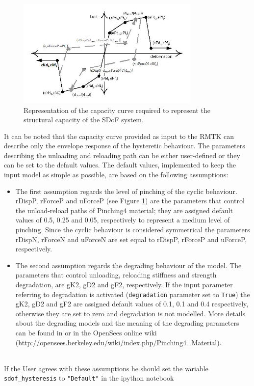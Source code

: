 \begin{figure}[htb]
  \centering
      \includegraphics[width=9cm]{figures/Pinching4.jpg}
  \caption{Representation of the capacity curve required to represent the structural capacity of the SDoF system.}
  \label{fig:backbone}
\end{figure}

It can be noted that the capacity curve provided as input to the RMTK can describe only the envelope response of the hysteretic behaviour. The parameters describing the unloading and reloading path can be either user-defined or they can be set to the default values. The default values, implemented to keep the input model as simple as possible, are based on the following assumptions:\\

\begin{itemize}
\item The first assumption regards the level of pinching of the cyclic behaviour. rDispP, rForceP and uForceP (see Figure \ref{fig:backbone}) are the parameters that control the unload-reload paths of Pinching4 material; they are assigned default values of 0.5, 0.25 and 0.05, respectively to represent a medium level of pinching. Since the cyclic behaviour is considered symmetrical the parameters rDispN, rForceN and uForceN are set equal to rDispP, rForceP and uForceP, respectively.
\item The second assumption regards the degrading behaviour of the model. The parameters that control unloading, reloading stiffness and strength degradation, are gK2, gD2 and gF2, respectively. If the input parameter referring to degradation is activated (\verb=degradation= parameter set to \verb=True=) the gK2, gD2 and gF2 are assigned default values of 0.1, 0.1 and 0.4 respectively, otherwise they are set to zero and degradation is not modelled. More details about the degrading models and the meaning of the degrading parameters can be found in \citep{LowesEtAl2003} or in the OpenSees online wiki (\href{http://opensees.berkeley.edu/wiki/index.php/Pinching4_Material}{http://opensees.berkeley.edu/wiki/index.php/Pinching4\_Material}).
\end{itemize}
\\
If the User agrees with these assumptions he should set the variable \verb=sdof_hysteresis= to \verb="Default"= in the ipython notebook

